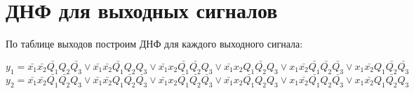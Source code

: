 \documentclass[listings]{labreport}
\begin{document}
\section*{ДНФ для выходных сигналов}

По таблице выходов построим ДНФ для каждого выходного сигнала:

$$y_1 = \bar{x_1}\bar{x_2}\bar{Q_1}Q_2\bar{Q_3} \lor \bar{x_1}\bar{x_2}\bar{Q_1}Q_2Q_3 \lor \bar{x_1}x_2\bar{Q_1}\bar{Q_2}Q_3 \lor \bar{x_1}x_2Q_1\bar{Q_2}Q_3 \lor x_1\bar{x_2}\bar{Q_1}\bar{Q_2}\bar{Q_3} \lor x_1\bar{x_2}Q_1\bar{Q_2}\bar{Q_3}$$
$$y_2 = \bar{x_1}\bar{x_2}\bar{Q_1}\bar{Q_2}Q_3 \lor \bar{x_1}\bar{x_2}Q_1\bar{Q_2}\bar{Q_3} \lor \bar{x_1}x_2\bar{Q_1}\bar{Q_2}\bar{Q_3} \lor \bar{x_1}x_2\bar{Q_1}Q_2Q_3 \lor x_1\bar{x_2}\bar{Q_1}Q_2\bar{Q_3} \lor x_1\bar{x_2}Q_1\bar{Q_2}Q_3$$
\end{document}
